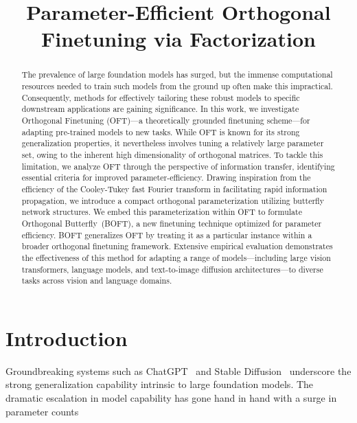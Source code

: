 \title{Parameter-Efficient Orthogonal Finetuning via Factorization}

\begin{abstract}
The prevalence of large foundation models has surged, but the immense computational resources needed to train such models from the ground up often make this impractical. Consequently, methods for effectively tailoring these robust models to specific downstream applications are gaining significance. In this work, we investigate Orthogonal Finetuning (OFT)—a theoretically grounded finetuning scheme—for adapting pre-trained models to new tasks. While OFT is known for its strong generalization properties, it nevertheless involves tuning a relatively large parameter set, owing to the inherent high dimensionality of orthogonal matrices. To tackle this limitation, we analyze OFT through the perspective of information transfer, identifying essential criteria for improved parameter-efficiency. Drawing inspiration from the efficiency of the Cooley-Tukey fast Fourier transform in facilitating rapid information propagation, we introduce a compact orthogonal parameterization utilizing butterfly network structures. We embed this parameterization within OFT to formulate Orthogonal Butterfly~(BOFT), a new finetuning technique optimized for parameter efficiency. BOFT generalizes OFT by treating it as a particular instance within a broader orthogonal finetuning framework. Extensive empirical evaluation demonstrates the effectiveness of this method for adapting a range of models—including large vision transformers, language models, and text-to-image diffusion architectures—to diverse tasks across vision and language domains.
\end{abstract}

\section{Introduction}

Groundbreaking systems such as ChatGPT~\cite{brown2020language,chen2021evaluating} and Stable Diffusion~\cite{rombach2022high} underscore the strong generalization capability intrinsic to large foundation models. The dramatic escalation in model capability has gone hand in hand with a surge in parameter counts

